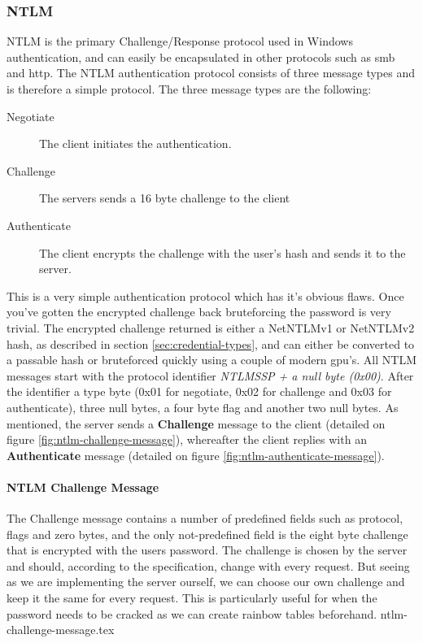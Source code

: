 \documentclass{article}
\begin{document}
\subsubsection{NTLM}
NTLM is the primary Challenge/Response protocol used in Windows authentication, and can easily be encapsulated in other protocols such as \gls{smb} and \gls{http}. The NTLM authentication protocol consists of three message types and is therefore a simple protocol\cite{url:microsoft:ntlm-message-syntax}. The three message types are the following:

\begin{description}
    \item[Negotiate] The client initiates the authentication.
    \item[Challenge] The servers sends a 16 byte challenge to the client
    \item[Authenticate] The client encrypts the challenge with the user's hash and sends it to the server.
\end{description}

This is a very simple authentication protocol which has it's obvious flaws. Once you've gotten the encrypted challenge back bruteforcing the password is very trivial. The encrypted challenge returned is either a NetNTLMv1 or NetNTLMv2 hash, as described in section \ref{sec:credential-types}, and can either be converted to a passable hash or bruteforced quickly using a couple of modern \gls{gpu}'s. All NTLM messages start with the protocol identifier \emph{NTLMSSP + a null byte (0x00)}\cite{url:http-ntlm-authentication}. After the identifier a type byte (0x01 for negotiate, 0x02 for challenge and 0x03 for authenticate), three null bytes, a four byte flag and another two null bytes. As mentioned, the server sends a \textbf{Challenge} message to the client (detailed on figure \ref{fig:ntlm-challenge-message}), whereafter the client replies with an \textbf{Authenticate} message (detailed on figure \ref{fig:ntlm-authenticate-message}).

\paragraph{NTLM Challenge Message}
The Challenge message contains a number of predefined fields such as protocol, flags and zero bytes, and the only not-predefined field is the eight byte challenge that is encrypted with the users password. The challenge is chosen by the server and should, according to the specification, change with every request. But seeing as we are implementing the server ourself, we can choose our own challenge and keep it the same for every request. This is particularly useful for when the password needs to be cracked as we can create rainbow tables beforehand.
{ntlm-challenge-message.tex}
\end{document}
